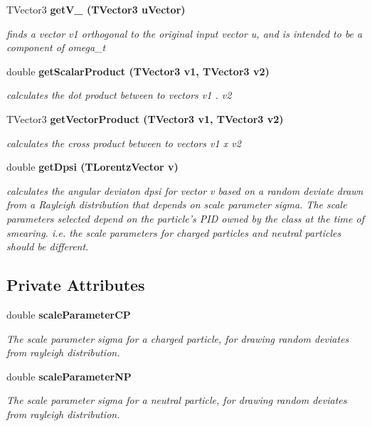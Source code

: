 \begin{CompactItemize}
TVector3 \bf{get\-V\_} (TVector3 u\-Vector)
\begin{CompactList}\small\item\em finds a vector v1 orthogonal to the original input vector u, and is intended to be a component of omega\_\-t \item\end{CompactList}\item 
double \bf{get\-Scalar\-Product} (TVector3 v1, TVector3 v2)
\begin{CompactList}\small\item\em calculates the dot product between to vectors v1 . v2 \item\end{CompactList}\item 
TVector3 \bf{get\-Vector\-Product} (TVector3 v1, TVector3 v2)
\begin{CompactList}\small\item\em calculates the cross product between to vectors v1 x v2 \item\end{CompactList}\item 
double \bf{get\-Dpsi} (TLorentz\-Vector v)
\begin{CompactList}\small\item\em calculates the angular deviaton dpsi for vector v based on a random deviate drawn from a Rayleigh distribution that depends on scale parameter sigma. The scale parameters selected depend on the particle's PID owned by the class at the time of smearing. i.e. the scale parameters for charged particles and neutral particles should be different. \item\end{CompactList}\end{CompactItemize}
\subsection*{Private Attributes}
\begin{CompactItemize}
\item 
double \bf{scale\-Parameter\-CP}
\begin{CompactList}\small\item\em The scale parameter sigma for a charged particle, for drawing random deviates from rayleigh distribution. \item\end{CompactList}\item 
double \bf{scale\-Parameter\-NP}
\begin{CompactList}\small\item\em The scale parameter sigma for a neutral particle, for drawing random deviates from rayleigh distribution. \item\end{CompactList}\end{CompactItemize}


